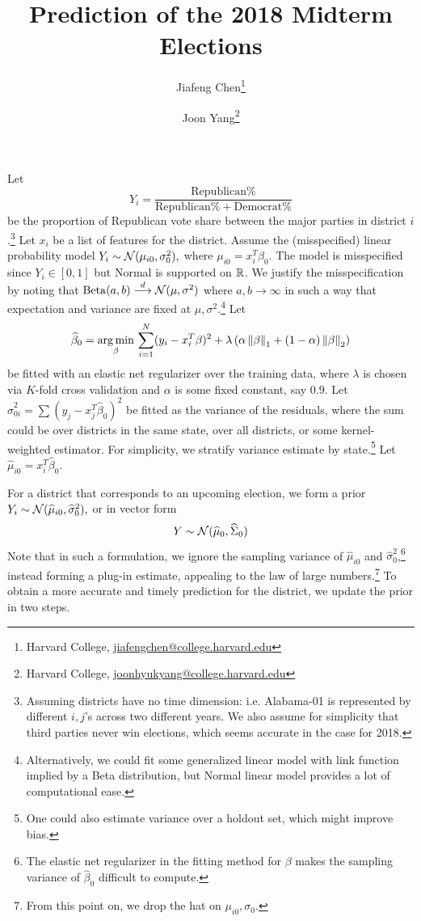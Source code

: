 \documentclass[10pt]{article}
\title{Prediction of the 2018 Midterm Elections}
\author{Jiafeng Chen\thanks{Harvard College, \url{jiafengchen@college.harvard.edu}} \and Joon Yang\thanks{Harvard College, \url{joonhyukyang@college.harvard.edu}}}
\begin{document}
\maketitle

Let \[Y_i = \frac{\text{Republican}\% }{\text{Republican}\% + \text{Democrat}\%}\] be the proportion of Republican vote share between the major parties in district $i$.\footnote{Assuming districts have no time dimension: i.e. Alabama-01 is represented by different $i,j$'s across two different years. We also assume for simplicity that third parties never win elections, which seems accurate in the case for 2018.} Let $x_i$ be a list of features for the district. Assume the (misspecified) linear probability model
$Y_i \sim \mathcal{N}(\mu_{i0}, \sigma_0^2),$ where $\mu_{i0} = x_i^T \beta_0$. The model is misspecified since $Y_i \in [0,1]$ but Normal is supported on $\mathbb{R}$. We justify the misspecification by noting that $\operatorname{Beta}(a,b) \overset{d}{\longrightarrow} \mathcal{N}(\mu,\sigma^2)$ where $a, b \to \infty$ in such a way that expectation and variance are fixed at $\mu,\sigma^2$.\footnote{Alternatively, we could fit some generalized linear model with link function implied by a Beta distribution, but Normal linear model provides a lot of computational ease.}
Let \begin{align*}
\widehat \beta_0 = \operatorname*{arg\,min}_\beta \, \sum_{i=1}^{N} (y_i - x_i^T \beta)^2 + \lambda\left({\alpha \left\lVert\beta\right\rVert_1 + (1-\alpha) \left\lVert\beta\right\rVert_2}\right)
\end{align*}
be fitted with an elastic net regularizer over the training data, where $\lambda$ is chosen via $K$-fold cross validation and $\alpha$ is some fixed constant, say $0.9$. Let $\hat \sigma_{0i}^2 = \sum (y_j - x_j^T \hat\beta_0)^2$ be fitted as the variance of the residuals, where the sum could be over districts in the same state, over all districts, or some kernel-weighted estimator. For simplicity, we stratify variance estimate by state.\footnote{One could also estimate variance over a holdout set, which might improve bias.} Let $\hat \mu_{i0} = x_i^T \hat \beta_0$.

For a district that corresponds to an upcoming election, we form a prior 
$Y_i\sim \mathcal{N}(\widehat \mu_{i0}, \widehat \sigma_0^2),$ or in vector form \[
Y \sim \mathcal{N}(\widehat \mu_0, \widehat \Sigma_0)
\]
Note that in such a formulation, we ignore the sampling variance of $\hat \mu_{i0}$ and $\hat \sigma_0^2$,\footnote{The elastic net regularizer in the fitting method for $\beta$ makes the sampling variance of $\hat\beta_0$ difficult to compute.} instead forming a plug-in estimate, appealing to the law of large numbers.\footnote{From this point on, we drop the hat on $\mu_{i0}, \sigma_0$.} To obtain a more accurate and timely prediction for the district, we update the prior in two steps.  
\end{document}
